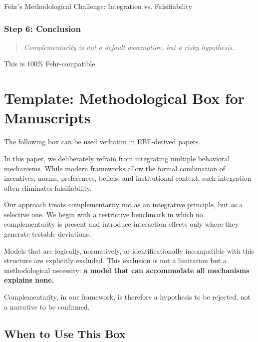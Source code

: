 \begin{chapter}{Fehr's Methodological Challenge: Integration vs. Falsifiability}
\subsubsection{Step 6: Conclusion}

\begin{quote}
\textit{Complementarity is not a default assumption, but a risky hypothesis.}
\end{quote}

This is 100\% Fehr-compatible.


\section{Template: Methodological Box for Manuscripts}
\label{sec:template-box}

The following box can be used verbatim in EBF-derived papers.

\begin{tcolorbox}[colback=gray!10!white,colframe=gray!75!black,
    title=\textbf{Box: Why We Do Not Integrate All Models}]

In this paper, we deliberately refrain from integrating multiple behavioral mechanisms.
While modern frameworks allow the formal combination of incentives, norms, preferences,
beliefs, and institutional context, such integration often eliminates falsifiability.

Our approach treats complementarity not as an integrative principle, but as a selective one.
We begin with a restrictive benchmark in which no complementarity is present and introduce
interaction effects only where they generate testable deviations.

Models that are logically, normatively, or identificationally incompatible with this
structure are explicitly excluded. This exclusion is not a limitation but a methodological
necessity: \textbf{a model that can accommodate all mechanisms explains none.}

Complementarity, in our framework, is therefore a hypothesis to be rejected,
not a narrative to be confirmed.

\end{tcolorbox}

\subsection{When to Use This Box}


\end{chapter}
